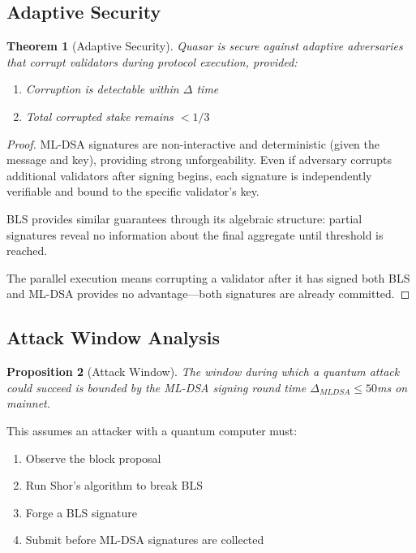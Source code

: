 \documentclass[11pt,a4paper]{article}
\newtheorem{theorem}{Theorem}
\newtheorem{proposition}[theorem]{Proposition}
\begin{document}
\subsection{Adaptive Security}

\begin{theorem}[Adaptive Security]
Quasar is secure against adaptive adversaries that corrupt validators during protocol execution, provided:
\begin{enumerate}
    \item Corruption is detectable within $\Delta$ time
    \item Total corrupted stake remains $< 1/3$
\end{enumerate}
\end{theorem}

\begin{proof}
ML-DSA signatures are non-interactive and deterministic (given the message and key), providing strong unforgeability. Even if adversary corrupts additional validators after signing begins, each signature is independently verifiable and bound to the specific validator's key.

BLS provides similar guarantees through its algebraic structure: partial signatures reveal no information about the final aggregate until threshold is reached.

The parallel execution means corrupting a validator after it has signed both BLS and ML-DSA provides no advantage---both signatures are already committed.
\end{proof}

\subsection{Attack Window Analysis}

\begin{proposition}[Attack Window]
The window during which a quantum attack could succeed is bounded by the ML-DSA signing round time $\Delta_{MLDSA} \leq 50$ms on mainnet.
\end{proposition}

This assumes an attacker with a quantum computer must:
\begin{enumerate}
    \item Observe the block proposal
    \item Run Shor's algorithm to break BLS
    \item Forge a BLS signature
    \item Submit before ML-DSA signatures are collected
\end{enumerate}
\end{document}
